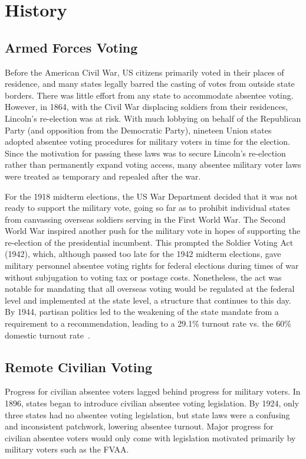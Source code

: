 \section{History}
\subsection{Armed Forces Voting}
Before the American Civil War, US citizens primarily voted in their
places of residence, and many states legally barred the casting of
votes from outside state borders. There was little effort from any
state to accommodate absentee voting. However, in 1864, with the Civil
War displacing soldiers from their residences, Lincoln's re-election
was at risk. With much lobbying on behalf of the Republican Party (and
opposition from the Democratic Party), nineteen Union states adopted
absentee voting procedures for military voters in time for the
election. Since the motivation for passing these laws was to secure
Lincoln's re-election rather than permanently expand voting access,
many absentee military voter laws were treated as temporary and
repealed after the war.

For the 1918 midterm elections, the US War Department decided that it
was not ready to support the military vote, going so far as to
prohibit individual states from canvassing overseas soldiers serving
in the First World War. The Second World War inspired another push for
the military vote in hopes of supporting the re-election of the
presidential incumbent. This prompted the Soldier Voting Act (1942),
which, although passed too late for the 1942 midterm elections, gave
military personnel absentee voting rights for federal elections during
times of war without subjugation to voting tax or postage
costs. Nonetheless, the act was notable for mandating that all
overseas voting would be regulated at the federal level and
implemented at the state level, a structure that continues to this
day. By 1944, partisan politics led to the weakening of the state
mandate from a requirement to a recommendation, leading to a 29.1\%
turnout rate vs. the 60\% domestic turnout rate~\cite{smith2015}.



\subsection{Remote Civilian Voting}

Progress for civilian absentee voters lagged behind progress for
military voters. In 1896, states began to introduce civilian absentee
voting legislation. By 1924, only three states had no absentee voting
legislation, but state laws were a confusing and inconsistent
patchwork, lowering absentee turnout. Major progress for civilian
absentee voters would only come with legislation motivated primarily
by military voters such as the FVAA.

